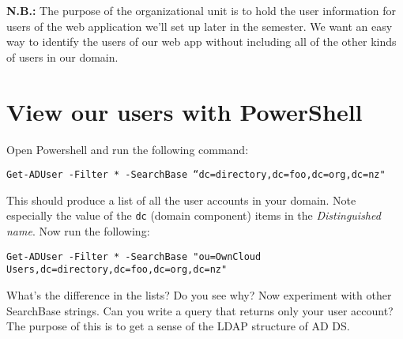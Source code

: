 \documentclass{article}
\begin{document}
\textbf{N.B.:} The purpose of the organizational unit is to hold the user information for users of the web application we'll set up later in the semester. We want an easy way to identify the users of our web app without including all of the other kinds of users in our domain.

\section{View our users with PowerShell}
Open Powershell and run the following command: 

\texttt{Get-ADUser -Filter * -SearchBase ``dc=directory,dc=foo,dc=org,dc=nz"}

This should produce a list of all the user accounts in your domain.  Note especially the value of the \texttt{dc} (domain component) items in the \emph{Distinguished name}. Now run the following:

\texttt{Get-ADUser -Filter * -SearchBase "ou=OwnCloud Users,dc=directory,dc=foo,dc=org,dc=nz"}

What's the difference in the lists? Do you see why?  Now experiment with other SearchBase strings. Can you write a query that returns only your user account? The purpose of this is to get a sense of the LDAP
structure of AD DS.
\end{document}
